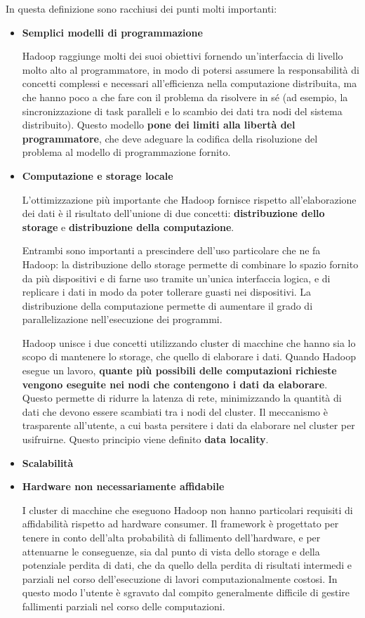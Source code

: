 \documentclass[italian,a4paper, twoside, 12pt]{report}
\begin{document}
In questa definizione sono racchiusi dei punti molti importanti:

\begin{itemize}
\item
  \textbf{Semplici modelli di programmazione}

  Hadoop raggiunge molti dei suoi obiettivi fornendo un'interfaccia di
  livello molto alto al programmatore, in modo di potersi assumere la
  responsabilità di concetti complessi e necessari all'efficienza nella
  computazione distribuita, ma che hanno poco a che fare con il problema
  da risolvere in sé (ad esempio, la sincronizzazione di task paralleli
  e lo scambio dei dati tra nodi del sistema distribuito). Questo
  modello \textbf{pone dei limiti alla libertà del programmatore}, che
  deve adeguare la codifica della risoluzione del problema al modello di
  programmazione fornito.
\item
  \textbf{Computazione e storage locale}

  L'ottimizzazione più importante che Hadoop fornisce rispetto
  all'elaborazione dei dati è il risultato dell'unione di due concetti:
  \textbf{distribuzione dello storage} e \textbf{distribuzione della
  computazione}.

  Entrambi sono importanti a prescindere dell'uso particolare che ne fa
  Hadoop: la distribuzione dello storage permette di combinare lo spazio
  fornito da più dispositivi e di farne uso tramite un'unica interfaccia
  logica, e di replicare i dati in modo da poter tollerare guasti nei
  dispositivi. La distribuzione della computazione permette di aumentare
  il grado di parallelizazione nell'esecuzione dei programmi.

  Hadoop unisce i due concetti utilizzando cluster di macchine che hanno
  sia lo scopo di mantenere lo storage, che quello di elaborare i dati.
  Quando Hadoop esegue un lavoro, \textbf{quante più possibili delle
  computazioni richieste vengono eseguite nei nodi che contengono i dati
  da elaborare}. Questo permette di ridurre la latenza di rete,
  minimizzando la quantità di dati che devono essere scambiati tra i
  nodi del cluster. Il meccanismo è trasparente all'utente, a cui basta
  persitere i dati da elaborare nel cluster per usifruirne. Questo
  principio viene definito \textbf{data locality}.
\item
  \textbf{Scalabilità}

  \textbar{}\textbar{}\textbar{}
\item
  \textbf{Hardware non necessariamente affidabile}

  I cluster di macchine che eseguono Hadoop non hanno particolari
  requisiti di affidabilità rispetto ad hardware consumer. Il framework
  è progettato per tenere in conto dell'alta probabilità di fallimento
  dell'hardware, e per attenuarne le conseguenze, sia dal punto di vista
  dello storage e della potenziale perdita di dati, che da quello della
  perdita di risultati intermedi e parziali nel corso dell'esecuzione di
  lavori computazionalmente costosi. In questo modo l'utente è sgravato
  dal compito generalmente difficile di gestire fallimenti parziali nel
  corso delle computazioni.
\end{itemize}
\end{document}
